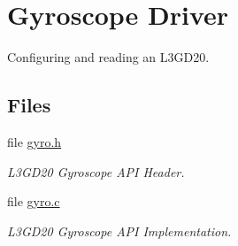 \hypertarget{group__gyro}{\section{Gyroscope Driver}
\label{group__gyro}
}


Configuring and reading an L3\-G\-D20.  


\subsection*{Files}
\begin{DoxyCompactItemize}
\item 
file \hyperlink{gyro_8h}{gyro.\-h}
\begin{DoxyCompactList}\small\item\em L3\-G\-D20 Gyroscope A\-P\-I Header. \end{DoxyCompactList}\item 
file \hyperlink{gyro_8c}{gyro.\-c}
\begin{DoxyCompactList}\small\item\em L3\-G\-D20 Gyroscope A\-P\-I Implementation. \end{DoxyCompactList}\end{DoxyCompactItemize}
